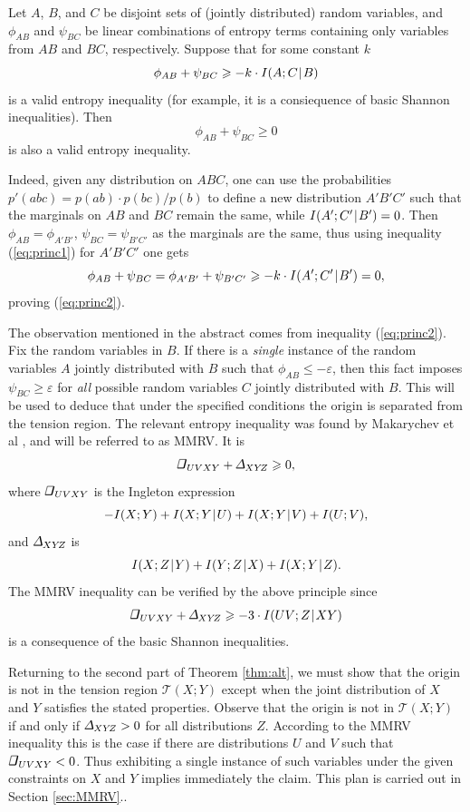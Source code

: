 \documentclass{IEEEtran}
\newcommand\eps{\varepsilon}
\newcommand\T{\mathcal{T}}
\newcommand\ing{\begin{tikzpicture}[scale=0.13\ht\strutbox]%
        \draw[line width=0.015cm](0,0)--(0.055,0.22)--(0.22,0.22);
        \draw[line width=0.035cm](0.22,0.22)--(0.165,0);
        \draw[line width=0.025cm](0.165,0)--(0,0);
   \end{tikzpicture}}
\renewcommand\Delta{\begin{tikzpicture}[scale=0.13\ht\strutbox]%
       \draw[line width=0.015cm](0,0)--(0.137+0.02,0.22);
       \draw[line width=0.035cm](0.137+0.02,0.22)--(0.165+0.04,0);
       \draw[line width=0.025cm](0.165+0.04,0)--(0,0);
   \end{tikzpicture}}
\newcommand\XYZ{{XY\!Z}}
\newcommand\I{I\xspace}
\def\|{\mkern 1.4mu\mathord{|}\mkern 1.4mu}
\renewcommand{\ge}{\geqslant}
\renewcommand{\le}{\leqslant}
\begin{document}
Let $A$, $B$, and $C$ be disjoint sets of (jointly distributed) random
variables, and $\phi_{AB}$ and $\psi_{BC}$ be linear combinations of entropy
terms containing only variables from $AB$ and $BC$, respectively. Suppose
that for some constant $k$
\begin{equation}\label{eq:princ1}
    \phi_{AB} + \psi_{BC} \ge -k\cdot\I(A;C\|B)
\end{equation}
is a valid entropy inequality (for example, it is a consiequence of basic
Shannon inequalities). Then
\begin{equation}\label{eq:princ2}
   \phi_{AB} + \psi_{BC} \ge 0
\end{equation}
is also a valid entropy inequality.

Indeed, given any distribution on $ABC$, one can use the probabilities
$p'(abc)=p(ab)\cdot p(bc)/p(b)$ to define a new distribution $A'B'C'$ such
that the marginals on $AB$ and $BC$ remain the same, while
$\I(A';C'\|B')=0$. Then $\phi_{AB}=\phi_{A'B'}$, $\psi_{BC}=\psi_{B'C'}$ as
the marginals are the same, thus using inequality (\ref{eq:princ1}) for
$A'B'C'$ one gets
$$
    \phi_{AB}+\psi_{BC}=\phi_{A'B'} + \psi_{B'C'}
     \ge -k\cdot\I(A';C'\|B') = 0,
$$
proving (\ref{eq:princ2}).

The observation mentioned in the abstract comes from inequality
(\ref{eq:princ2}). Fix the random variables in $B$. If there is a
\emph{single} instance of the random variables $A$ jointly distributed with
$B$ such that $\phi_{AB} \le -\eps$, then this fact imposes
$\psi_{BC}\ge\eps$ for \emph{all} possible random variables $C$ jointly
distributed with $B$. This will be used to deduce that under the specified
conditions the origin is separated from the tension region. The relevant
entropy inequality was found by Makarychev et al \cite{MMRV}, and will be
referred to as MMRV. It is
\begin{equation}\label{eq:MMRV}
  \ing_{UVXY}+\Delta_\XYZ\ge 0,
\end{equation}
where $\ing_{UVXY}$ is the Ingleton expression
$$
  -\I(X;Y)+\I(X;Y\|U)+\I(X;Y\|V)+\I(U;V),
$$
and $\Delta_\XYZ$ is
$$
 \I(X;Z\|Y)+\I(Y;Z\|X)+\I(X;Y\|Z).
$$
The MMRV inequality can be verified by the above principle since
$$
  \ing_{UVXY}+\Delta_\XYZ \ge -3\cdot\I(UV;Z\|XY)
$$
is a consequence of the basic Shannon inequalities.

Returning to the second part of Theorem \ref{thm:alt}, we must show that the
origin is not in the tension region $\T(X;Y)$ except when the joint
distribution of $X$ and $Y$ satisfies the stated properties. Observe that
the origin is not in $\T(X;Y)$ if and only if $\Delta_\XYZ>0$ for all
distributions $Z$. According to the MMRV inequality this is the case if
there are distributions $U$ and $V$ such that $\ing_{UVXY}<0$. Thus
exhibiting a single instance of such variables under the given constraints
on $X$ and $Y$ implies immediately the claim. This plan is carried out in
Section \ref{sec:MMRV}..
\end{document}
